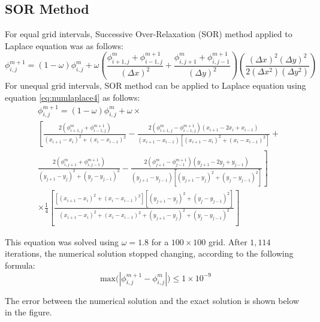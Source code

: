 \documentclass[12pt,a4paper,fleqn]{article}
\begin{document}
    \subsection*{SOR Method}
    For equal grid intervals, Successive Over-Relaxation (SOR) method applied to Laplace equation was as follows:
    \begin{equation} \label{eq:numlaplacesorequal}
    \phi^{m+1}_{i,j} = (1-\omega)\phi^m_{i,j} + \omega
    \left(
    \frac{\phi^m_{i+1,j}+\phi^{m+1}_{i-1,j}}{(\Delta x)^2} +
    \frac{\phi^m_{i,j+1}+\phi^{m+1}_{i,j-1}}{(\Delta y)^2}
    \right)\left(\frac{(\Delta x)^2(\Delta y)^2}{2(\Delta x^2)(\Delta y^2)}
    \right)
    \end{equation}
    For unequal grid intervals, SOR method can be applied to Laplace equation using equation \eqref{eq:numlaplace4} as follows:
    \begin{align} \label{eq:numlaplacesorunequal}
    &\phi^{m+1}_{i,j} = (1-\omega)\phi^m_{i,j} + \omega\times{} \nonumber\\
    &\left[\frac{2(\phi^m_{i+1,j} + \phi^{m+1}_{i-1,j})}{(x_{i+1} - x_i)^2 + (x_i - x_{i-1})^2} - \frac{2(\phi^m_{i+1,j} - \phi^{m+1}_{i-1,j})(x_{i+1} - 2x_i + x_{i-1})}{(x_{i+1} - x_{i-1})[(x_{i+1} - x_i)^2 + (x_i - x_{i-1})^2]} + {} \right.\nonumber\\
    &\left.\frac{2(\phi^m_{i,j+1} + \phi^{m+1}_{i,j-1})}{(y_{j+1} - y_j)^2 + (y_j - y_{j-1})^2} - \frac{2(\phi^m_{j+1} - \phi^{m+1}_{j-1})(y_{j+1} - 2y_j + y_{j-1})}{(y_{j+1} - y_{j-1})[(y_{j+1} - y_j)^2 + (y_j - y_{j-1})^2]}\right] \nonumber\\
    &\times\frac{1}{4}\left[\frac{[(x_{i+1} - x_i)^2 + (x_i - x_{i-1})^2][(y_{j+1} - y_j)^2 + (y_j - y_{j-1})^2]}{(x_{i+1} - x_i)^2 + (x_i - x_{i-1})^2 + (y_{j+1} - y_j)^2 + (y_j - y_{j-1})^2}\right]
    \end{align}
    
    This equation was solved using $\omega = 1.8$ for a $100\times100$ grid. After $1,114$ iterations, the numerical solution stopped changing, according to the following formula:
    \begin{equation} \label{eq:tolerance}
    \text{max}\Big(|\phi^{m+1}_{i,j} - \phi^m_{i,j}|\Big) \leq 1\times 10^{-9}
    \end{equation}
    
    The error between the numerical solution and the exact solution is shown below in the figure.
    
\end{document}
